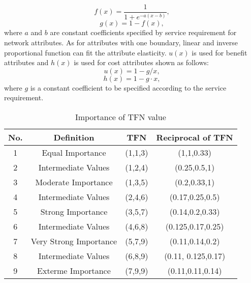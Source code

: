 \documentclass[conference]{IEEEtran}
\begin{document}
\begin{equation}   
\label{equ10}
f(x) = \frac{1}{{1 + {e^{ - a(x - b)}}}}  ,
\end{equation}
\begin{equation}   
\label{equ11}
g(x) = 1 - f(x)   ,
\end{equation}
where $a$ and $b$ are constant coefficients specified by service requirement for network attributes.
As for attributes with one boundary, linear and inverse proportional function can fit the attribute elasticity. $u(x)$ is used for benefit attributes and $h(x)$ is used for cost attributes shown as follows:
\begin{equation}   
\label{equ12}
u(x)=1-g/x ,
\end{equation}
\begin{equation}   
\label{equ13}
h(x) = 1 - g \cdot x  ,
\end{equation}
where $g$ is a constant coefficient to be specified according to the service requirement.
\begin{table}[t]
	
	\caption{Importance of TFN value}
	\begin{center}
		\begin{tabular}{c c c c}
			\hline
			\textbf{No.}&\textbf{Definition}&\textbf{TFN}&\textbf{Reciprocal of TFN} \\
			\hline
			\cline{1-4}
			1 & Equal Importance & (1,1,3) & (1,1,0.33)			\\
			2 & Intermediate Values & (1,2,4) & (0.25,0.5,1)	\\
			3 & Moderate Importance & (1,3,5) & (0.2,0.33,1)	\\
			4 & Intermediate Values & (2,4,6) & (0.17,0.25,0.5)	\\
			5 & Strong Importance & (3,5,7) & (0.14,0.2,0.33)	\\
			6 & Intermediate Values & (4,6,8) & (0.125,0.17,0.25)	\\
			7 & Very Strong Importance & (5,7,9) & (0.11,0.14,0.2)	\\
			8 & Intermediate Values & (6,8,9) & (0.11, 0.125,0.17)	\\
			9 & Exterme Importance & (7,9,9) & (0.11,0.11,0.14)		\\
			\hline
			
		\end{tabular}
		\label{tab1}
	\end{center}
\end{table}
\end{document}
